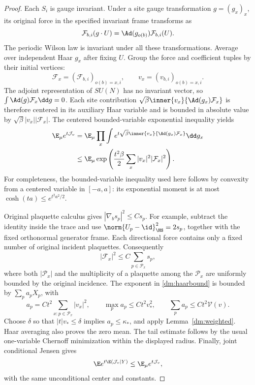 \begin{proof}
Each \(S_i\) is gauge invariant. Under a site gauge transformation \(g=(g_x)_x\), its original force in the specified invariant frame transforms as
\begin{equation}
 \mathcal F_{b,i}(g\cdot U)=\Ad(g_{o(b)})\mathcal F_{b,i}(U).
 \label{dm:gaugeforce}
\end{equation}
The periodic Wilson law is invariant under all these transformations. Average over independent Haar \(g_x\) after fixing \(U\). Group the force and coefficient tuples by their initial vertices:
\[
 \mathcal F_x=(\mathcal F_{b,i})_{o(b)=x,i},\qquad
 v_x=(v_{b,i})_{o(b)=x,i}.
\]
The adjoint representation of \(SU(N)\) has no invariant vector, so
\(\int\Ad(g)\mathcal F_x\dd g=0\). Each site contribution
\(\sqrt\beta\inner{v_x}{\Ad(g_x)\mathcal F_x}\) is therefore centered in its auxiliary Haar variable and is bounded in absolute value by
\(\sqrt\beta|v_x||\mathcal F_x|\). The centered bounded-variable exponential inequality yields
\begin{align}
 \E_\mu e^{t\mathcal J_v}
 &=\E_\mu\prod_x\int
 e^{t\sqrt\beta\inner{v_x}{\Ad(g_x)\mathcal F_x}}\dd g_x\notag\\
 &\le\E_\mu\exp\left(
       \frac{t^2\beta}{2}\sum_x|v_x|^2|\mathcal F_x|^2\right).
 \label{dm:haarbound}
\end{align}
For completeness, the bounded-variable inequality used here follows by convexity from a centered variable in \([-a,a]\): its exponential moment is at most \(\cosh(ta)\le e^{t^2a^2/2}\).

Original plaquette calculus gives
\(|\nabla_b s_p|^2\le C s_p\). For example, subtract the identity inside the trace and use
\(\norm{U_p-\id}_{\HS}^2=2s_p\), together with the fixed orthonormal generator frame. Each directional force contains only a fixed number of original incident plaquettes. Consequently
\[
 |\mathcal F_x|^2\le C\sum_{p\in\mathcal P_x}s_p,
\]
where both \(|\mathcal P_x|\) and the multiplicity of a plaquette among the \(\mathcal P_x\) are uniformly bounded by the original incidence. The exponent in \eqref{dm:haarbound} is bounded by \(\sum_pa_pX_p\), with
\[
 a_p=Ct^2\sum_{x:p\in\mathcal P_x}|v_x|^2,
 \qquad \max_pa_p\le C t^2v_*^2,
 \qquad \sum_pa_p\le Ct^2\mathcal V(v).
\]
Choose \(\delta\) so that \(|t|v_*\le\delta\) implies \(a_p\le\kappa_*\), and apply Lemma~\ref{dm:weighted}. Haar averaging also proves the zero mean. The tail estimate follows by the usual one-variable Chernoff minimization within the displayed radius. Finally, joint conditional Jensen gives
\[
 \E e^{t\E(\mathcal J_v\mid Y)}\le\E_\mu e^{t\mathcal J_v},
\]
with the same unconditional center and constants.
\end{proof}

